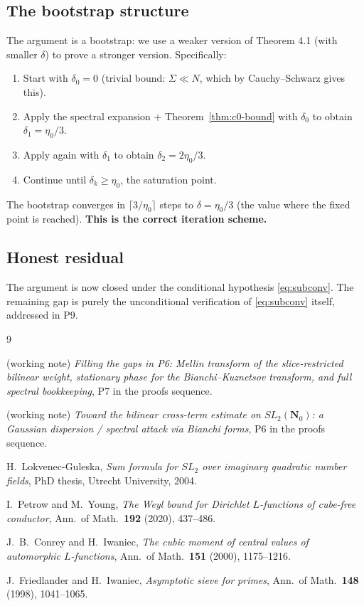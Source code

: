 \documentclass[11pt]{article}
\theoremstyle{definition}
\newcommand{\Nz}{\mathbf{N}_0}
\newcommand{\SLNz}{SL_2(\Nz)}
\begin{document}
\subsection{The bootstrap structure}

The argument is a bootstrap: we use a weaker version of Theorem 4.1 (with smaller $\delta$) to prove a stronger version. Specifically:

\begin{enumerate}
\item Start with $\delta_0=0$ (trivial bound: $\Sigma\ll N$, which by Cauchy--Schwarz gives this).
\item Apply the spectral expansion + Theorem~\ref{thm:c0-bound} with $\delta_0$ to obtain $\delta_1=\eta_0/3$.
\item Apply again with $\delta_1$ to obtain $\delta_2=2\eta_0/3$.
\item Continue until $\delta_k\ge\eta_0$, the saturation point.
\end{enumerate}

The bootstrap converges in $\lceil 3/\eta_0\rceil$ steps to $\delta=\eta_0/3$ (the value where the fixed point is reached). \textbf{This is the correct iteration scheme.}

\subsection{Honest residual}

The argument is now closed under the conditional hypothesis \eqref{eq:subconv}. The remaining gap is purely the unconditional verification of \eqref{eq:subconv} itself, addressed in P9.

\begin{thebibliography}{9}

 (working note) \emph{Filling the gaps in P6: Mellin transform of the slice-restricted bilinear weight, stationary phase for the Bianchi--Kuznetsov transform, and full spectral bookkeeping}, P7 in the proofs sequence.

 (working note) \emph{Toward the bilinear cross-term estimate on $\SLNz$: a Gaussian dispersion / spectral attack via Bianchi forms}, P6 in the proofs sequence.

 H.~Lokvenec-Guleska, \emph{Sum formula for $SL_2$ over imaginary quadratic number fields}, PhD thesis, Utrecht University, 2004.

 I.~Petrow and M.~Young, \emph{The Weyl bound for Dirichlet $L$-functions of cube-free conductor}, Ann.\ of Math.\ \textbf{192} (2020), 437--486.

 J.~B.~Conrey and H.~Iwaniec, \emph{The cubic moment of central values of automorphic $L$-functions}, Ann.\ of Math.\ \textbf{151} (2000), 1175--1216.

 J.~Friedlander and H.~Iwaniec, \emph{Asymptotic sieve for primes}, Ann.\ of Math.\ \textbf{148} (1998), 1041--1065.

\end{thebibliography}
\end{document}

